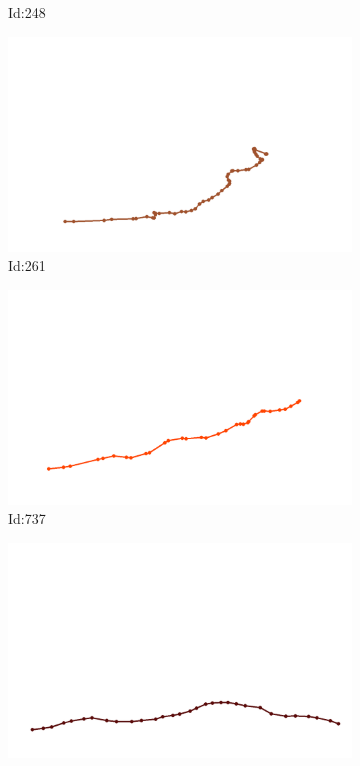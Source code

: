 \documentclass[12pt,twoside]{report}
\begin{document}
\begin{figure}
\begin{subfigure}[b]{0.20\textwidth}
\caption{Id:248}
\end{subfigure}
\begin{subfigure}[b]{0.20\textwidth}
\centering
\includegraphics[width=\textwidth]{../../trajectories/261.png}
\caption{Id:261}
\end{subfigure}
\begin{subfigure}[b]{0.20\textwidth}
\centering
\includegraphics[width=\textwidth]{../../trajectories/737.png}
\caption{Id:737}
\end{subfigure}
\begin{subfigure}[b]{0.20\textwidth}
\centering
\includegraphics[width=\textwidth]{../../trajectories/813.png}

\end{subfigure}
\end{figure}
\end{document}
